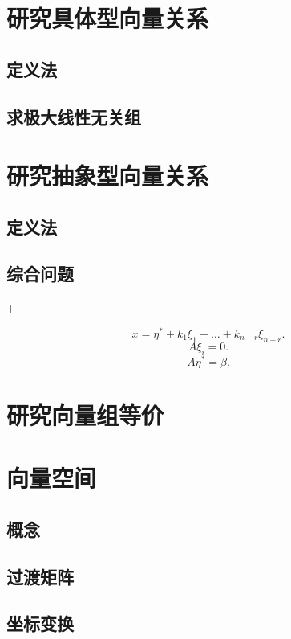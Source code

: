 
\section{研究具体型向量关系}

\subsection{定义法}
\subsection{求极大线性无关组}
\section{研究抽象型向量关系}
\subsection{定义法}
\subsection{综合问题}
\DOne+\DTwoThree

$$x = \eta^{*} + k_{1} \xi_{1} + \ldots + k_{n-r} \xi_{n-r}.$$
$$
    A \xi_{i} = 0.
$$
$$A \eta^{*} = \beta.$$
\section{研究向量组等价}
\section{向量空间}
\subsection{概念}
\subsection{过渡矩阵}
\subsection{坐标变换}